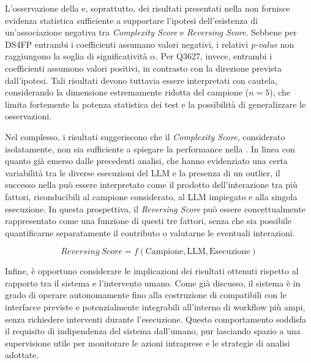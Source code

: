 \begin{table}[t]
    \centering
    \caption[Correlazione tra \emph{Complexity Score} e \emph{Reversing Score}]{
        Risultati delle correlazioni di Pearson e Kendall tra \emph{Complexity Score} e \emph{Reversing Score}.
    }
    \label{tab:correlation_scores}
\end{table}

L'osservazione della  e, soprattutto, dei risultati presentati nella  non fornisce evidenza statistica sufficiente a supportare l'ipotesi dell'esistenza di un'associazione negativa tra \emph{Complexity Score} e \emph{Reversing Score}. Sebbene per DS4FP entrambi i coefficienti assumano valori negativi, i relativi \emph{p-value} non raggiungono la soglia di significatività $\alpha$. Per Q3627, invece, entrambi i coefficienti assumono valori positivi, in contrasto con la direzione prevista dall'ipotesi. Tali risultati devono tuttavia essere interpretati con cautela, considerando la dimensione estremamente ridotta del campione (\(n=5\)), che limita fortemente la potenza statistica dei test e la possibilità di generalizzare le osservazioni.

Nel complesso, i risultati suggeriscono che il \emph{Complexity Score}, considerato isolatamente, non sia sufficiente a spiegare la performance nella \reversing{}. In linea con quanto già emerso dalle precedenti analisi, che hanno evidenziato una certa variabilità tra le diverse esecuzioni del LLM e la presenza di un outlier, il successo nella \reversing{} può essere interpretato come il prodotto dell'interazione tra più fattori, riconducibili al campione considerato, al LLM impiegato e alla singola esecuzione. In questa prospettiva, il \emph{Reversing Score} può essere concettualmente rappresentato come una funzione di questi tre fattori, senza che sia possibile quantificarne separatamente il contributo o valutarne le eventuali interazioni.

\begin{equation*}
    Reversing\ Score = f(\mathrm{Campione}, \mathrm{LLM}, \mathrm{Esecuzione})
    \label{eq:reversing_score}
\end{equation*}

Infine, è opportuno considerare le implicazioni dei risultati ottenuti rispetto al rapporto tra il sistema e l'intervento umano. Come già discusso, il sistema è in grado di operare autonomamente fino alla costruzione di \capture{} compatibili con le interfacce previste e potenzialmente integrabili all'interno di workflow più ampi, senza richiedere interventi durante l'esecuzione. Questo comportamento soddisfa il requisito di indipendenza del sistema dall'umano, pur lasciando spazio a una supervisione utile per monitorare le azioni intraprese e le strategie di analisi adottate.

